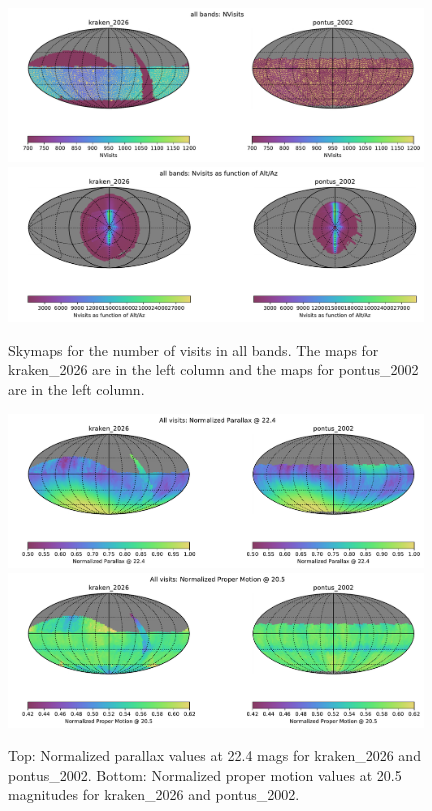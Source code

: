 \documentclass[DM,authoryear,toc]{lsstdoc}
\begin{document}
\begin{figure}[ht]
\centering
\includegraphics[width=0.98\textwidth]{figures/pontus_2002_kraken_2026_NVisits_all_bands_HEAL_ComboSkyMap.pdf}\\
\includegraphics[width=0.98\textwidth]{figures/pontus_2002_kraken_2026_Nvisits_as_function_of_Alt_Az_all_bands_HEAL_ComboSkyMap.pdf}
\caption{Skymaps for the number of visits in all bands. The maps for kraken\_2026 are in the left column and the maps for pontus\_2002 are
in the left column.}
\label{fig:nvisits-2002}
\end{figure}

\begin{figure}[ht]
\centering
\includegraphics[width=0.98\textwidth]{figures/pontus_2002_kraken_2026_Normalized_Parallax_22_4_All_visits_HEAL_ComboSkyMap.pdf}\\
\includegraphics[width=0.98\textwidth]{figures/pontus_2002_kraken_2026_Normalized_Proper_Motion_20_5_All_visits_HEAL_ComboSkyMap.pdf}
\caption{Top: Normalized parallax values at 22.4 mags for kraken\_2026 and pontus\_2002. Bottom: Normalized proper motion values
at 20.5 magnitudes for kraken\_2026 and pontus\_2002.}
\label{fig:parallax-pm-2002}
\end{figure}
\end{document}

